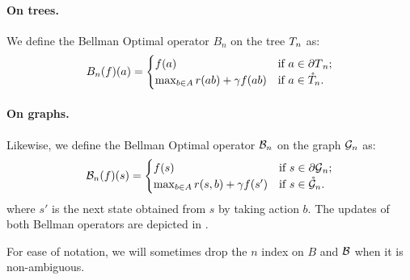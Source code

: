\documentclass[runningheads]{llncs}
\begin{document}
\begin{definition}
	\paragraph{\textbf{On trees.}} We define the Bellman Optimal operator $B_n$ on the tree $T_n$ as:
	\begin{equation}
	\label{eq:bellman-tree}
	B_n(f)(a) = \begin{cases}
	f(a) & \text{if $a\in{\partial T}_n$;} \\
	\max_{b\in A} r(ab) + \gamma f({ab})
	& \text{if $a\in\mathring{T}_n$.}
	\end{cases}
	\end{equation}
	
	\paragraph{\textbf{On graphs.}} Likewise, we define the Bellman Optimal operator $\mathcal{B}_n$ on the graph $\mathcal{G}_n$ as:
	\begin{equation}
	\label{eq:bellman-graph}
	\mathcal{B}_n(f)(s) = \begin{cases}
	f(s) & \text{if $s\in{\partial \mathcal{G}}_n$;} \\
	\max_{b\in A} r(s, b) + \gamma f(s')
	& \text{if $s\in\mathring{\mathcal{G}}_n$.}
	\end{cases}
	\end{equation}
	where $s'$ is the next state obtained from $s$ by taking action $b$.
	The updates of both Bellman operators are depicted in .
\end{definition}

\begin{remark}
	For ease of notation, we will sometimes drop the $n$ index on $B$ and $\mathcal{B}$ when it is non-ambiguous.
\end{remark}
\end{document}
